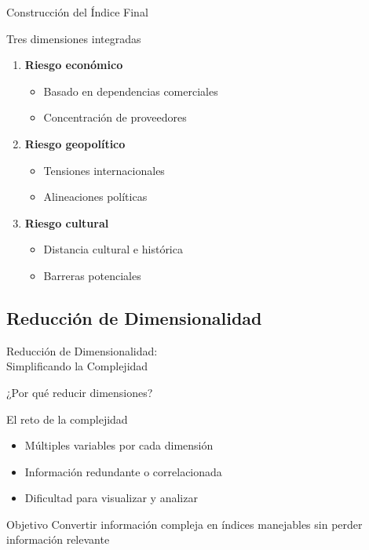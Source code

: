 \documentclass{beamer}
\begin{document}
\begin{frame}{Construcción del Índice Final}
    \begin{block}{Tres dimensiones integradas}
        \begin{enumerate}
            \item \textbf{Riesgo económico}
                \begin{itemize}
                    \item Basado en dependencias comerciales
                    \item Concentración de proveedores
                \end{itemize}
            \item \textbf{Riesgo geopolítico}
                \begin{itemize}
                    \item Tensiones internacionales
                    \item Alineaciones políticas
                \end{itemize}
            \item \textbf{Riesgo cultural}
                \begin{itemize}
                    \item Distancia cultural e histórica
                    \item Barreras potenciales
                \end{itemize}
        \end{enumerate}
    \end{block}
\end{frame}

\subsection{Reducción de Dimensionalidad}

\begin{frame}
    \centering
    \Huge{Reducción de Dimensionalidad: \\
    Simplificando la Complejidad}
\end{frame}

\begin{frame}{¿Por qué reducir dimensiones?}
    \begin{block}{El reto de la complejidad}
        \begin{itemize}
            \item Múltiples variables por cada dimensión
            \item Información redundante o correlacionada
            \item Dificultad para visualizar y analizar
        \end{itemize}
    \end{block}
    
    \begin{alertblock}{Objetivo}
        Convertir información compleja en índices manejables sin perder información relevante
    \end{alertblock}
\end{frame}
\end{document}
